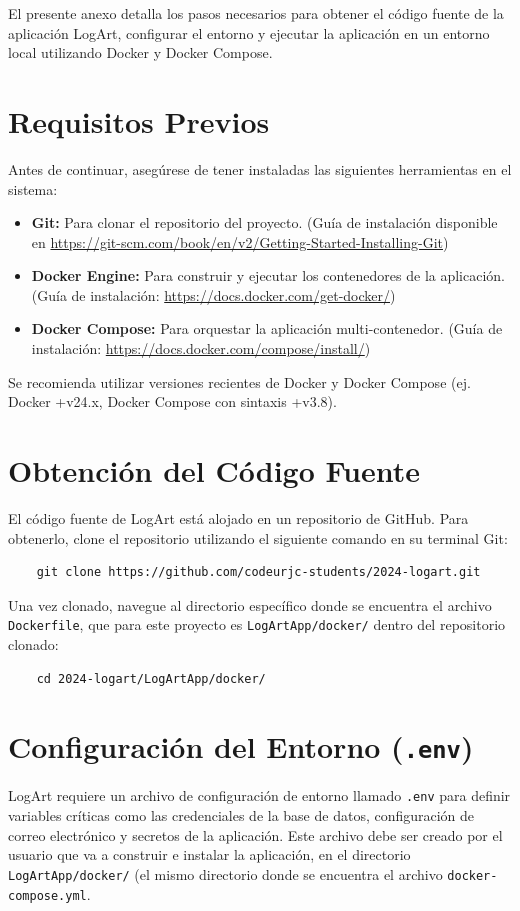 El presente anexo detalla los pasos necesarios para obtener el código fuente de la aplicación LogArt, configurar el entorno y ejecutar la aplicación en un entorno local utilizando Docker y Docker Compose.

\section{Requisitos Previos}
\label{appA:requisitosPrevios}

Antes de continuar, asegúrese de tener instaladas las siguientes herramientas en el sistema:
\begin{itemize}
    \item \textbf{Git:} Para clonar el repositorio del proyecto. (Guía de instalación disponible en \url{https://git-scm.com/book/en/v2/Getting-Started-Installing-Git})
    \item \textbf{Docker Engine:} Para construir y ejecutar los contenedores de la aplicación. (Guía de instalación: \url{https://docs.docker.com/get-docker/})
    \item \textbf{Docker Compose:} Para orquestar la aplicación multi-contenedor. (Guía de instalación: \url{https://docs.docker.com/compose/install/})
\end{itemize}
Se recomienda utilizar versiones recientes de Docker y Docker Compose (ej. Docker +v24.x, Docker Compose con sintaxis +v3.8).

\section{Obtención del Código Fuente}
\label{appA:obtencionCodigo}

El código fuente de LogArt está alojado en un repositorio de GitHub. Para obtenerlo, clone el repositorio utilizando el siguiente comando en su terminal Git:
\begin{verbatim}
    git clone https://github.com/codeurjc-students/2024-logart.git
\end{verbatim}

Una vez clonado, navegue al directorio específico donde se encuentra el archivo \texttt{Dockerfile}, que para este proyecto es \texttt{LogArtApp/docker/} dentro del repositorio clonado:
\begin{verbatim}
    cd 2024-logart/LogArtApp/docker/
\end{verbatim}

\section{Configuración del Entorno (\texttt{.env})}
\label{appA:configuracionEntorno}
LogArt requiere un archivo de configuración de entorno llamado \texttt{.env} para definir variables críticas como las credenciales de la base de datos, configuración de correo electrónico y secretos de la aplicación. Este archivo debe ser creado por el usuario que va a construir e instalar la aplicación, en el directorio \texttt{LogArtApp/docker/} (el mismo directorio donde se encuentra el archivo \texttt{docker-compose.yml}.


